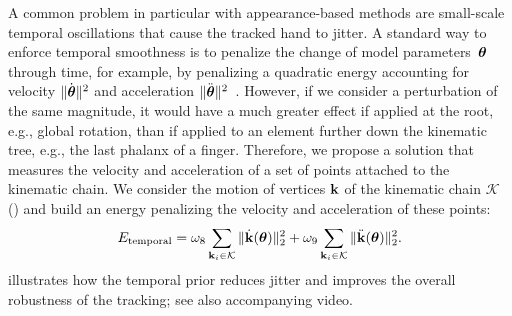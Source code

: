 A common problem in particular with appearance-based methods are small-scale temporal oscillations that cause the tracked hand to jitter. A standard way to enforce temporal smoothness is to penalize the change of model parameters~$\boldsymbol{\theta}$ through time, for example, by penalizing a quadratic energy accounting for velocity $\|\dot {\boldsymbol{\theta}}\|^2$ and acceleration $\|\ddot {\boldsymbol{\theta}}\|^2$~\cite{wei_siga12}. 
% 
% 
However, if we consider a perturbation of the same magnitude, it would have a much greater effect if applied at the root, e.g., global rotation, than if applied to an element further down the kinematic tree, e.g., the last phalanx of a finger. 
Therefore, we propose a solution that measures the velocity and acceleration of a set of points attached to the kinematic chain. We consider the motion of vertices $\mathbf{k}$ of the kinematic chain $\mathcal{K}$ () and build an energy penalizing the velocity and acceleration of these points:
\begin{eqnarray}
    E_{\text{temporal}} = \omega_8 \sum_{\mathbf{k}_i \in \mathcal{K}} \| \dot {\mathbf{k}}(\boldsymbol{\theta}) \|_2^2 + \omega_9 \sum_{\mathbf{k}_i \in \mathcal{K}} \| \ddot {\mathbf{k}}(\boldsymbol{\theta}) \|_2^2.
\end{eqnarray}
%
 illustrates how the temporal prior reduces jitter and improves the overall robustness of the tracking; see also accompanying video.

